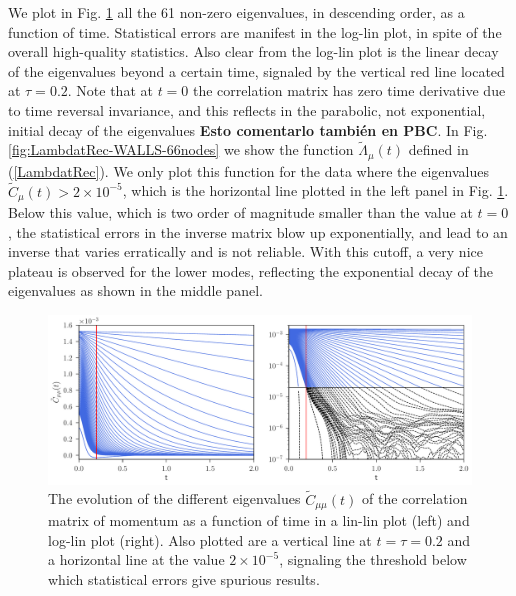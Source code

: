 \documentclass[b5paper,openright,11pt]{book}
\newcommand{\Note}[1]{{\bf \color{red}#1}}    %
\begin{document}
We plot in Fig.  \ref{fig:CtRec-WALLS-66nodes-exp}  all the 61 non-zero eigenvalues, in
descending  order,  as a  function  of  time. Statistical  errors  are
manifest in  the log-lin  plot, in spite  of the  overall high-quality
statistics. Also  clear from the log-lin  plot is the linear  decay of
the eigenvalues  beyond a certain  time, signaled by the  vertical red
line  located at  $\tau=0.2$.   Note that  at  $t=0$ the  correlation
matrix has zero  time derivative due to time  reversal invariance, and
this reflects in the parabolic,  not exponential, initial decay of the
eigenvalues \Note{Esto comentarlo también en PBC}.  In Fig.  \ref{fig:LambdatRec-WALLS-66nodes}  we show
the      function      $\tilde{\Lambda}_{\mu}(t)$      defined      in
(\ref{LambdatRec}). We only plot this  function for the data where the
eigenvalues   $\tilde{C}_{\mu}(t)>2\times10^{-5}$,    which   is   the
horizontal line plotted in the left panel in Fig.  \ref{fig:CtRec-WALLS-66nodes-exp}.  Below this value, which is
two  order  of  magnitude  smaller   than  the  value  at  $t=0$,  the
statistical errors  in the inverse  matrix blow up  exponentially, and
lead to an inverse that varies  erratically and is not reliable.  With
this cutoff,  a very  nice plateau  is observed  for the  lower modes,
reflecting the  exponential decay of  the eigenvalues as shown  in the
middle panel.

\begin{figure}[h!]
  \centering
  \includegraphics[width=\linewidth]{CtRec-WALLS-66nodes-exp}
  \caption[Evolution of different eigenvalues $\tilde{C}_{\mu\nu}(t)$ for confined fluid - 66 nodes.]{
  The  evolution of  the different
  eigenvalues  $\tilde{C}_{\mu\mu}(t)$ of  the  correlation matrix  of
  momentum  as  a  function  of   time  in  a  lin-lin  plot  (left)
  and   log-lin   plot
  (right). Also  plotted are  a vertical line  at $t=\tau=0.2$  and a
  horizontal  line  at  the   value  $2\times10^{-5}$,  signaling  the
  threshold below which statistical errors give spurious results. }
\label{fig:CtRec-WALLS-66nodes-exp}
\end{figure}
\end{document}
